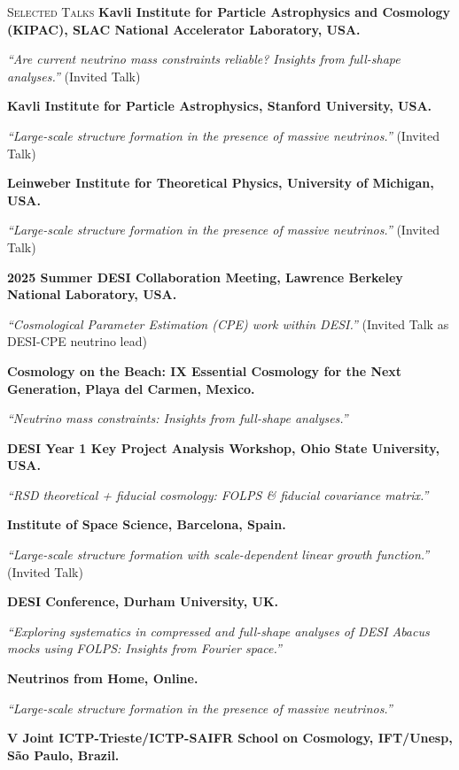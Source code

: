 \begin{rubric}{\faMicrophone \textsc{Selected Talks}}
\entry*[]
	\textbf{Kavli Institute for Particle Astrophysics and Cosmology (KIPAC), SLAC National Accelerator Laboratory, USA.} \par
    \emph{“Are current neutrino mass constraints reliable? Insights from full-shape analyses.”} (Invited Talk)


\entry*[]
	\textbf{Kavli Institute for Particle Astrophysics, Stanford University, USA.} \par
    \emph{“Large-scale structure formation in the presence of massive neutrinos.”} (Invited Talk)

\entry*[]
	\textbf{Leinweber Institute for Theoretical Physics, University of Michigan, USA.} \par
    \emph{“Large-scale structure formation in the presence of massive neutrinos.”} (Invited Talk)

\entry*[]
    \textbf{2025 Summer DESI Collaboration Meeting, Lawrence Berkeley National Laboratory, USA.} \par
    \emph{“Cosmological Parameter Estimation (CPE) work within DESI.”} (Invited Talk as DESI-CPE neutrino lead)

\entry*[]%
    \textbf{Cosmology on the Beach: IX Essential Cosmology for the Next Generation, Playa del Carmen, Mexico.} \par
    \emph{“Neutrino mass constraints: Insights from full-shape analyses.”}

\entry*[]
    \textbf{DESI Year 1 Key Project Analysis Workshop, Ohio State University, USA.} \par
    \emph{“RSD theoretical + fiducial cosmology: FOLPS \& fiducial covariance matrix.”}

\entry*[]%
    \textbf{Institute of Space Science, Barcelona, Spain.} \par
    \emph{“Large-scale structure formation with scale-dependent linear growth function.”} (Invited Talk)

\entry*[]%
    \textbf{DESI Conference, Durham University, UK.} \par
    \emph{“Exploring systematics in compressed and full-shape analyses of DESI Abacus mocks using FOLPS: Insights from Fourier space.”}


\entry*[]%
    \textbf{Neutrinos from Home, Online.} \par
    \emph{“Large-scale structure formation in the presence of massive neutrinos.”}

\entry*[]%
\textbf{V Joint ICTP-Trieste/ICTP-SAIFR School on Cosmology, IFT/Unesp, São Paulo, Brazil.}


\end{rubric}
